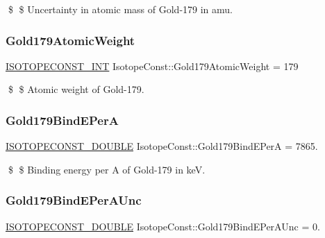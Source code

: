 \$ \$ Uncertainty in atomic mass of Gold-\/179 in amu. \mbox{\label{group___isotope_const-_gold-_au179_ga4b1fe906bda198bff54e3314f392994a}} 
\subsubsection{\texorpdfstring{Gold179\+Atomic\+Weight}{Gold179AtomicWeight}}
{\footnotesize\ttfamily \mbox{\hyperlink{group___isotope_const-_macros_ga5f18360b3e99483a35c32d789e62621c}{I\+S\+O\+T\+O\+P\+E\+C\+O\+N\+S\+T\+\_\+\+I\+NT}} Isotope\+Const\+::\+Gold179\+Atomic\+Weight = 179}

\$ \$ Atomic weight of Gold-\/179. \mbox{\label{group___isotope_const-_gold-_au179_ga7fde30b2e56ea64dbd38d60cf5011085}} 
\subsubsection{\texorpdfstring{Gold179\+Bind\+E\+PerA}{Gold179BindEPerA}}
{\footnotesize\ttfamily \mbox{\hyperlink{group___isotope_const-_macros_ga8f45a7272ce02c0b4c65c44636ed719a}{I\+S\+O\+T\+O\+P\+E\+C\+O\+N\+S\+T\+\_\+\+D\+O\+U\+B\+LE}} Isotope\+Const\+::\+Gold179\+Bind\+E\+PerA = 7865.}

\$ \$ Binding energy per A of Gold-\/179 in keV. \mbox{\label{group___isotope_const-_gold-_au179_ga0f81d105bf7ffb0758c4cee54225ed92}} 
\subsubsection{\texorpdfstring{Gold179\+Bind\+E\+Per\+A\+Unc}{Gold179BindEPerAUnc}}
{\footnotesize\ttfamily \mbox{\hyperlink{group___isotope_const-_macros_ga8f45a7272ce02c0b4c65c44636ed719a}{I\+S\+O\+T\+O\+P\+E\+C\+O\+N\+S\+T\+\_\+\+D\+O\+U\+B\+LE}} Isotope\+Const\+::\+Gold179\+Bind\+E\+Per\+A\+Unc = 0.}

